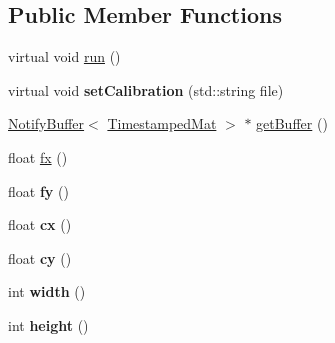 \subsection*{Public Member Functions}
\begin{DoxyCompactItemize}
\item 
virtual void \hyperlink{classlsd__slam_1_1_input_image_stream_a54d88ab343986e2a8f17d1ff5f5901be}{run} ()
\item 
\hypertarget{classlsd__slam_1_1_input_image_stream_a6e8bce6255dabfb4556e4fac8390a6b0}{virtual void {\bfseries set\-Calibration} (std\-::string file)}\label{classlsd__slam_1_1_input_image_stream_a6e8bce6255dabfb4556e4fac8390a6b0}

\item 
\hyperlink{classlsd__slam_1_1_notify_buffer}{Notify\-Buffer}$<$ \hyperlink{structlsd__slam_1_1_timestamped_object}{Timestamped\-Mat} $>$ $\ast$ \hyperlink{classlsd__slam_1_1_input_image_stream_ac8212a5168eb9bc3aa04f7bcc6922dfb}{get\-Buffer} ()
\item 
float \hyperlink{classlsd__slam_1_1_input_image_stream_a1198316d84d00116bcbee6358c591493}{fx} ()
\item 
\hypertarget{classlsd__slam_1_1_input_image_stream_ae8c6946d639eaa11bf228bb62fb0317c}{float {\bfseries fy} ()}\label{classlsd__slam_1_1_input_image_stream_ae8c6946d639eaa11bf228bb62fb0317c}

\item 
\hypertarget{classlsd__slam_1_1_input_image_stream_a56cdd46f70f734b5a3f34344f6f448ba}{float {\bfseries cx} ()}\label{classlsd__slam_1_1_input_image_stream_a56cdd46f70f734b5a3f34344f6f448ba}

\item 
\hypertarget{classlsd__slam_1_1_input_image_stream_a53b48fb8024b569ba167d886a2b28f3f}{float {\bfseries cy} ()}\label{classlsd__slam_1_1_input_image_stream_a53b48fb8024b569ba167d886a2b28f3f}

\item 
\hypertarget{classlsd__slam_1_1_input_image_stream_aae9c5e1689761e9ea6f9f4ce8682e8f1}{int {\bfseries width} ()}\label{classlsd__slam_1_1_input_image_stream_aae9c5e1689761e9ea6f9f4ce8682e8f1}

\item 
\hypertarget{classlsd__slam_1_1_input_image_stream_ab9a42e4ab63c80b7e0ba629ec689b7fa}{int {\bfseries height} ()}\label{classlsd__slam_1_1_input_image_stream_ab9a42e4ab63c80b7e0ba629ec689b7fa}

\end{DoxyCompactItemize}
